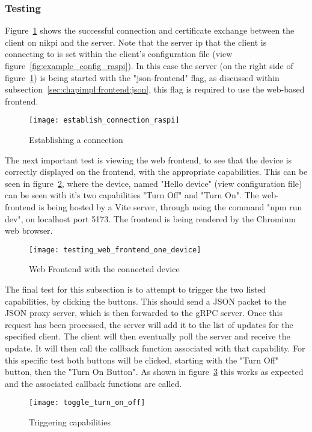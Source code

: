 \subsubsection{Testing}
Figure~\ref{fig:establish_connection_raspi} shows the successful connection and certificate exchange between the client on nikpi and the server. Note that the server ip that the client is connecting to is set within the client's configuration file (view figure~\ref{fig:example_config_raspi}). In this case the server (on the right side of figure~\ref{fig:establish_connection_raspi}) is being started with the "json-frontend" flag, as discussed within subsection~\ref{sec:chapimpl:frontend:json}, this flag is required to use the web-based frontend.
\begin{figure}[h]
\caption{Establishing a connection }
\texttt{[image: establish\_connection\_raspi]}
\label{fig:establish_connection_raspi}
\end{figure}

The next important test is viewing the web frontend, to see that the device is correctly displayed on the frontend, with the appropriate capabilities. This can be seen in figure~\ref{fig:web_frontend_one_connected_device}, where the device, named "Hello device" (view configuration file) can be seen with it's two capabilities "Turn Off" and "Turn On". The web-frontend is being hosted by a Vite server, through using the command "npm run dev", on localhost port 5173. The frontend is being rendered by the Chromium web browser.
\begin{figure}[h]
\caption{Web Frontend with the connected device}
\texttt{[image: testing\_web\_frontend\_one\_device]}
\label{fig:web_frontend_one_connected_device}
\end{figure}

The final test for this subsection is to attempt to trigger the two listed capabilities, by clicking the buttons. This should send a JSON packet to the JSON proxy server, which is then forwarded to the gRPC server. Once this request has been processed, the server will add it to the list of updates for the specified client. The client will then eventually poll the server and receive the update. It will then call the callback function associated with that capability. For this specific test both buttons will be clicked, starting with the "Turn Off" button, then the "Turn On Button". As shown in figure~\ref{fig:triggering_capability} this works as expected and the associated callback functions are called.
\begin{figure}[h]
\caption{Triggering capabilities}
\texttt{[image: toggle\_turn\_on\_off]}
\label{fig:triggering_capability}
\end{figure}

